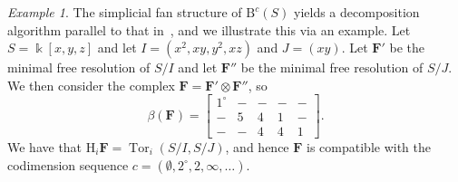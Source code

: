 \documentclass[12pt]{amsart}
\theoremstyle{definition}
\theoremstyle{remark}
\newtheorem{example}[lemma]{Example}
\newcommand{\Tor}{\operatorname{Tor}}
\newcommand{\kk}{\Bbbk}
\newcommand{\HH}{\mathrm{H}}
\newcommand{\cc}{c}
\newcommand{\FF}{\mathbf{F}}
\newcommand{\zp}{\circ}
\newcommand{\BBQ}{\mathrm{B}}
\begin{document}
\begin{example}\label{example:greedy decomposition}
The simplicial fan structure of $\BBQ^c(S)$ yields a decomposition algorithm parallel to that in~\cite[\S1]{eis-schrey1}, and we illustrate this via an example.  Let $S=\kk[x,y,z]$ and let $I=(x^2,xy,y^2,xz)$ and $J=(xy)$.  Let $\FF'$ be the minimal free resolution of $S/I$ and let $\FF''$ be the minimal free resolution of $S/J$.  We then consider the complex $\FF=\FF'\otimes \FF''$, so
\[
\beta(\FF)=
\begin{bmatrix}
1^\zp&-&-&-&-\\
-&{5}&{4}&{1}&-\\
-&-&4&4&{1}
\end{bmatrix}.
\]
We have that $\HH_i\FF=\Tor_i(S/I,S/J)$, and hence $\FF$ is compatible with the codimension sequence $\cc=(\emptyset, 2^\zp,2,\infty,\dots)$.    


\end{example}
\end{document}
